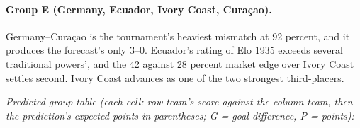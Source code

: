 \documentclass[11pt,letterpaper]{article}
\begin{document}


\paragraph{Group E (Germany, Ecuador, Ivory Coast, Curaçao).} Germany--Curaçao is the tournament's heaviest mismatch at 92 percent, and it produces the forecast's only 3--0. Ecuador's rating of Elo 1935 exceeds several traditional powers', and the 42 against 28 percent market edge over Ivory Coast settles second. Ivory Coast advances as one of the two strongest third-placers.

\noindent\textit{\footnotesize Predicted group table (each cell: row team's score against the column team, then the prediction's expected points in parentheses; G = goal difference, P = points):}
\end{document}
